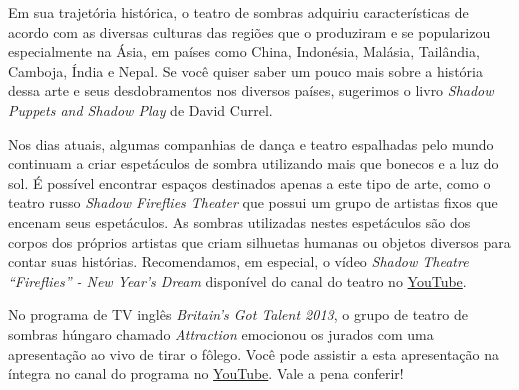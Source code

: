 Em sua trajetória histórica, o teatro de sombras adquiriu características de acordo com as diversas culturas das regiões que o produziram e se popularizou especialmente na Ásia, em países como China, Indonésia, Malásia, Tailândia, Camboja, Índia e Nepal. Se você quiser saber um pouco mais sobre a história dessa arte e seus desdobramentos nos diversos países, sugerimos o livro \emph{Shadow Puppets and Shadow Play} de David Currel.

Nos dias atuais, algumas companhias de dança e teatro espalhadas pelo mundo continuam a criar espetáculos de sombra utilizando mais que bonecos e a luz do sol. É possível encontrar espaços destinados apenas a este tipo de arte, como o teatro russo \emph{Shadow Fireflies Theater} que possui um grupo de artistas fixos que encenam seus espetáculos. As sombras utilizadas nestes espetáculos são dos corpos dos próprios artistas que criam silhuetas humanas ou objetos diversos para contar suas histórias. Recomendamos, em especial, o vídeo \emph{Shadow Theatre “Fireflies” - New Year’s Dream} disponível do canal do teatro no \href{https://www.youtube.com/watch?v=AzS0VwXOlWs}{YouTube}.



No programa de TV inglês \emph{Britain’s Got Talent 2013}, o grupo de teatro de sombras húngaro chamado \emph{Attraction} emocionou os jurados com uma apresentação ao vivo de tirar o fôlego. Você pode assistir a esta apresentação na íntegra no canal do programa no \href{https://www.youtube.com/watch?v=JOZS\_Vq6eKw}{YouTube}. Vale a pena conferir!



